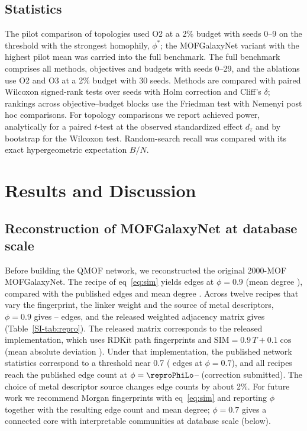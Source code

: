 \documentclass[journal=jcisd8,manuscript=article]{achemso}
\begin{document}
\subsection{Statistics}
The pilot comparison of topologies used O2 at a 2\% budget with seeds 0--9 on the threshold with the strongest homophily, $\phi^\ast$; the MOFGalaxyNet variant with the highest pilot mean was carried into the full benchmark. The full benchmark comprises all methods, objectives and budgets with seeds 0--29, and the ablations use O2 and O3 at a 2\% budget with 30 seeds. Methods are compared with paired Wilcoxon signed-rank tests over seeds\cite{wilcoxon1945} with Holm correction\cite{holm1979} and Cliff's $\delta$;\cite{cliff1993dominance} rankings across objective--budget blocks use the Friedman test\cite{friedman1937} with Nemenyi post hoc comparisons.\cite{demsar2006statistical} For topology comparisons we report achieved power, analytically for a paired $t$-test at the observed standardized effect $d_z$ and by bootstrap for the Wilcoxon test. Random-search recall was compared with its exact hypergeometric expectation $B/N$.

\section{Results and Discussion}

\subsection{Reconstruction of MOFGalaxyNet at database scale}
Before building the QMOF network, we reconstructed the original 2000-MOF MOFGalaxyNet. The recipe of eq~\ref{eq:sim} yields \reproSpecNine{} edges at $\phi=0.9$ (mean degree \reproSpecDeg{}), compared with the published \reproPub{} edges and mean degree \reproPubDeg{}. Across twelve recipes that vary the fingerprint, the linker weight and the source of metal descriptors, $\phi=0.9$ gives \reproRangeLo--\reproRangeHi{} edges, and the released weighted adjacency matrix gives \reproReleasedNine{} (Table~\ref{SI-tab:repro}). The released matrix corresponds to the released implementation, which uses RDKit path fingerprints and $\mathrm{SIM}=0.9\,T+0.1\cos$ (mean absolute deviation \reproMae{}). Under that implementation, the published network statistics correspond to a threshold near 0.7 (\reproReleasedSeven{} edges at $\phi=0.7$), and all recipes reach the published edge count at $\phi=\reproPhiLo$--\reproPhiHi{} (correction submitted). The choice of metal descriptor source changes edge counts by about 2\%. For future work we recommend Morgan fingerprints with eq~\ref{eq:sim} and reporting $\phi$ together with the resulting edge count and mean degree; $\phi=0.7$ gives a connected core with interpretable communities at database scale (below).
\end{document}

